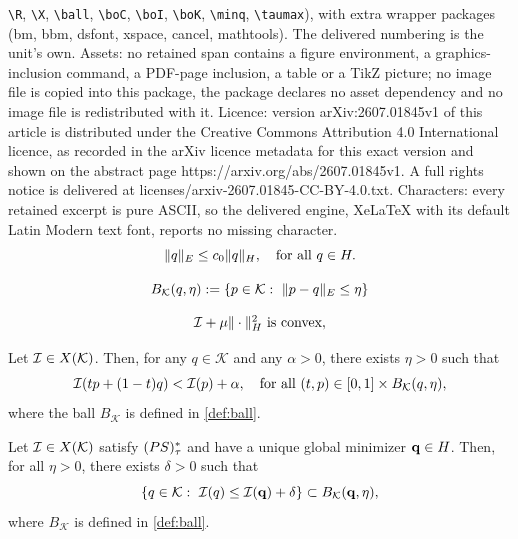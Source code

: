 \documentclass[10pt,a4paper]{amsart}
\newcommand{\Hilb}{{\textnormal H}}
\newcommand{\PS}{(\textnormal{PS})^{*}_\tau}
\newcommand{\X}{{\textnormal X}}
\newcommand{\ball}{B_\boK}
\newcommand{\boI}{\mathcal{I}}
\newcommand{\boK}{\mathcal{K}}
\newcommand{\minq}{{\bf q}}
\begin{document}
\texttt{\textbackslash R}, \texttt{\textbackslash X}, \texttt{\textbackslash ball}, \texttt{\textbackslash boC}, \texttt{\textbackslash boI}, \texttt{\textbackslash boK}, \texttt{\textbackslash minq}, \texttt{\textbackslash taumax}), with extra wrapper packages (bm, bbm, dsfont, xspace, cancel, mathtools). The delivered numbering is the unit's own. Assets: no retained span contains a figure environment, a graphics-inclusion command, a PDF-page inclusion, a table or a TikZ picture; no image file is copied into this package, the package declares no asset dependency and no image file is redistributed with it. Licence: version arXiv:2607.01845v1 of this article is distributed under the Creative Commons Attribution 4.0 International licence, as recorded in the arXiv licence metadata for this exact version and shown on the abstract page https://arxiv.org/abs/2607.01845v1. A full rights notice is delivered at licenses/arxiv-2607.01845-CC-BY-4.0.txt. Characters: every retained excerpt is pure ASCII, so the delivered engine, XeLaTeX with its default Latin Modern text font, reports no missing character.
    \begin{equation}\label{eq:embedding}
\|q\|_{\textnormal E}\leq c_0 \|q\|_\Hilb,\quad\hbox{for all }q\in\Hilb.
\end{equation}

\begin{equation}\label{def:ball}
\ball(q,\eta):=\{p\in\boK:\ \|p-q\|_{\textnormal E}\leq \eta\}
\end{equation}

\begin{equation}\label{hyp:convex}
		\hbox{$\boI + \mu\|\cdot\|_\Hilb^2$}\text{ is convex},
\end{equation}

\begin{lemma}\label{lemma-alpha}
	Let $\boI\in\X(\boK)$. Then, for any $q\in\boK$ and any $\alpha>0$, there exists $\eta>0$ such that
	\begin{equation}\label{ineq:lemma1}
		\boI(tp+(1-t) q)<\boI(p)+\alpha,\quad\hbox{for all }(t,p)\in [0,1]\times\ball(q,\eta),
	\end{equation} 
	where the ball $\ball$ is defined in \eqref{def:ball}.
\end{lemma}

\begin{lemma}\label{lemma-LevelSets}
	Let $\boI\in\X(\boK)$ satisfy $\PS$ and have a unique global minimizer $\minq\in\Hilb$. Then, for all $\eta>0$, there exists $\delta>0$ such that
	\begin{equation}\label{eq:InclusionLevelsets}
		\{q\in\boK:\ \boI(q)\leq\boI(\minq)+\delta\}\subset B_\boK(\minq,\eta),
	\end{equation}
    where $\ball$ is defined in \eqref{def:ball}.
\end{lemma}
\end{document}
